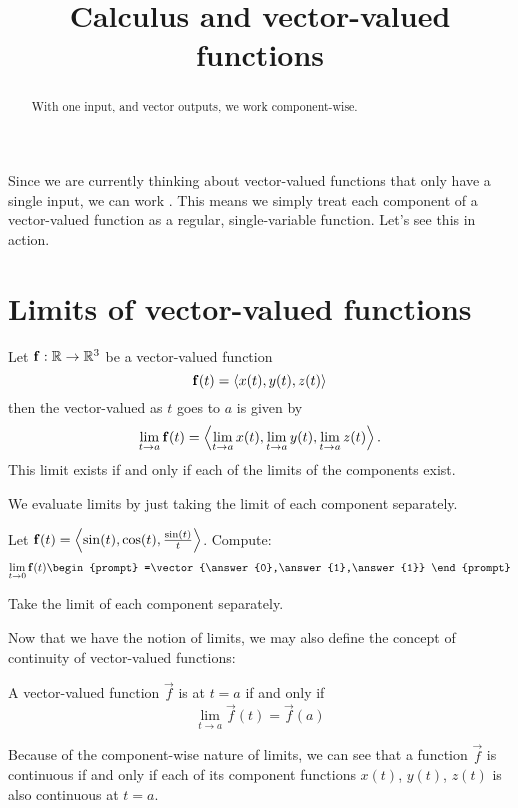 \documentclass{ximera}
\title[Dig-In:]{Calculus and vector-valued functions}
\begin{document}
\begin{abstract}
  With one input, and vector outputs, we work component-wise.
\end{abstract}
\maketitle


Since we are currently thinking about vector-valued functions that
only have a single input, we can work . This means
we simply treat each component of a vector-valued function as a
regular, single-variable function. Let's see this in action.

\section{Limits of vector-valued functions}

\begin{definition}
  Let $\mathbf{f}:\mathbb R \to \mathbb R^3$ be a vector-valued function
  \[
  \mathbf{f}(t) = \left\langle x(t),y(t),z(t)\right\rangle
  \]
  then the vector-valued  as $t$ goes to $a$ is given by 
  \[
  \lim_{t \to a} \mathbf{f}(t) = \left\langle \lim_{t \to a}x(t),\lim_{t \to a}y(t),\lim_{t \to a}z(t)\right\rangle.
  \]
  This limit exists if and only if each of the limits of the
  components exist.
\end{definition}

We evaluate limits by just taking the limit of each component
separately.

\begin{question}
  Let $\mathbf{f}(t) = \left\langle \sin(t),\cos(t),\frac{\sin(t)}{t}\right\rangle$.
  Compute:
  \[
  \lim_{t \to 0} \vec{f}(t)
  \begin{prompt}
    =\vector{\answer{0},\answer{1},\answer{1}}
  \end{prompt}
  \]
  \begin{hint}
    Take the limit of each component separately.
  \end{hint}
\end{question}

Now that we have the notion of limits, we may also define the concept
of continuity of vector-valued functions:

\begin{definition}
  A vector-valued function $\vec{f}$ is  at $t= a$ if
  and only if
  \[
  \lim_{t \to a} \vec{f}(t)  = \vec{f}(a)
  \]
\end{definition}
Because of the component-wise nature of limits, we can see that a
function $\vec{f}$ is continuous if and only if each of its component
functions $x(t)$, $y(t)$, $z(t)$ is also continuous at $t=a$.
\end{document}
